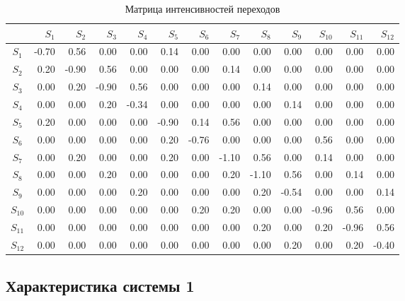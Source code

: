 \documentclass{article}
\begin{document}
\begin{table}[H]
    \centering
    \begin{tabular}{c|rrrrrrrrrrrr}
        & $S_1$ & $S_2$ & $S_3$ & $S_4$ & $S_5$ & $S_6$ & $S_7$ & $S_8$ & $S_9$ & $S_{10}$ & $S_{11}$ & $S_{12}$ \\
        \hline
        $S_1$     & -0.70 & 0.56 & 0.00 & 0.00 & 0.14 & 0.00 & 0.00 & 0.00 & 0.00 & 0.00 & 0.00 & 0.00 \\
        $S_2$     & 0.20 & -0.90 & 0.56 & 0.00 & 0.00 & 0.00 & 0.14 & 0.00 & 0.00 & 0.00 & 0.00 & 0.00 \\
        $S_3$     & 0.00 & 0.20 & -0.90 & 0.56 & 0.00 & 0.00 & 0.00 & 0.14 & 0.00 & 0.00 & 0.00 & 0.00 \\
        $S_4$     & 0.00 & 0.00 & 0.20 & -0.34 & 0.00 & 0.00 & 0.00 & 0.00 & 0.14 & 0.00 & 0.00 & 0.00 \\
        $S_5$     & 0.20 & 0.00 & 0.00 & 0.00 & -0.90 & 0.14 & 0.56 & 0.00 & 0.00 & 0.00 & 0.00 & 0.00 \\
        $S_6$     & 0.00 & 0.00 & 0.00 & 0.00 & 0.20 & -0.76 & 0.00 & 0.00 & 0.00 & 0.56 & 0.00 & 0.00 \\
        $S_7$     & 0.00 & 0.20 & 0.00 & 0.00 & 0.20 & 0.00 & -1.10 & 0.56 & 0.00 & 0.14 & 0.00 & 0.00 \\
        $S_8$     & 0.00 & 0.00 & 0.20 & 0.00 & 0.00 & 0.00 & 0.20 & -1.10 & 0.56 & 0.00 & 0.14 & 0.00 \\
        $S_9$     & 0.00 & 0.00 & 0.00 & 0.20 & 0.00 & 0.00 & 0.00 & 0.20 & -0.54 & 0.00 & 0.00 & 0.14 \\
        $S_{10}$  & 0.00 & 0.00 & 0.00 & 0.00 & 0.00 & 0.20 & 0.20 & 0.00 & 0.00 & -0.96 & 0.56 & 0.00 \\
        $S_{11}$  & 0.00 & 0.00 & 0.00 & 0.00 & 0.00 & 0.00 & 0.00 & 0.20 & 0.00 & 0.20 & -0.96 & 0.56 \\
        $S_{12}$  & 0.00 & 0.00 & 0.00 & 0.00 & 0.00 & 0.00 & 0.00 & 0.00 & 0.20 & 0.00 & 0.20 & -0.40
    \end{tabular}
    \caption{Матрица интенсивностей переходов}
    \label{tab:intensity_matrix}
\end{table}

\subsection*{Характеристика системы 1}
\end{document}
